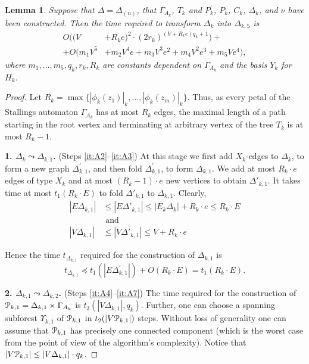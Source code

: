 \documentclass[a4paper,12pt]{article}
\newcommand{\G}{\Gamma }
\newcommand{\D}{\Delta }
\newcommand{\U}{\Upsilon }
\newcommand{\cP}{{\cal{P}}}
\newtheorem{lemma}[theorem]{Lemma}
\numberwithin{equation}{section}
\numberwithin{figure}{section}
\begin{document}
\begin{lemma}\label{lem:resolution} Suppose that $\D = \D_{(n)}$,
that $\G_{A_k}$, $T_k$ and $P_k^\prime$, $P_k$,  $C_k$, $\D_k$, and $\nu$  have been
constructed. Then the time required to transform $\D_k$ into $\D_{k,5}$ is
\[\begin{split}
O((V &+R_k e)^2\cdot (2r_k)^{(V + R_k e) q_k +1})+\\
+O(m_1 V^5 &+ m_2V^4 e +m_3 V^3 e^2 +m_4 V^2 e^3 + m_5 V e^4),
\end{split}
\]
where $m_1, \ldots, m_5, q_k, r_k,  R_k $ are constants dependent on
$\G_{A_k}$ and the basis $Y_k$ for $H_k$.

\end{lemma}

\begin{proof} Let $R_k  = \max \{ |\phi_k(z_1)|_k, \ldots, |\phi_k(z_m)|_k\}$. Thus, as
every petal of the Stallings automaton $\G_{A_k}$ has at most $R_k$
edges, the maximal length of a path starting in the root vertex
and terminating at arbitrary vertex of the tree $T_k$ is at most
$R_k-1$.

{\bf 1. $\D_k \leadsto \D_{k,1}$.}  (Steps \ref{it:A2}--\ref{it:A3}) At this stage we first add
$X_k$-edges to $\D_k$, to form a new graph $\D^\prime_{k,1}$, and then
fold $\D^\prime_{k,1}$, to form $\D_{k,1}$.  We add at most $R_k \cdot e$
edges of type $X_k$ and at most $(R_k-1)\cdot e$ new vertices to
obtain $\D'_{k,1}$. It takes time at most $t_1(R_k \cdot E )$ to fold
$\D'_{k,1}$ to  $\D_{k,1}$. Clearly,
\begin{equation}\label{evth1}
\begin{split}
|E\D_{k,1} | &\le |E\D'_{k,1} | \le |E_k\D_k | + R_k \cdot e \le
R_k \cdot E\\
&{\textrm{ and }}\\
|V \D_{k,1}| &\le |V \D'_{k,1} | \le V + R_k\cdot e
\end{split}
\end{equation}


Hence the time $t_{\D_{k,1}}$ required for the construction of $\D_{k,1}$
is
\begin{equation}\label{theta1}
t_{\D_{k,1}} \preceq t_1(|E \D_{k,1}^\prime |) + O(R_k \cdot E) =t_1(R_k
\cdot E) .
\end{equation}


{\bf 2. $\D_{k,1} \leadsto \D_{k,2}$.}  (Steps \ref{it:A4}--\ref{it:A7}) The time required for the
construction of $\cP_{k,1}=\D_{k,1}\times \G_{A_k}$ is $t_3(|V \D_{k,1}|, q_k)$.
Further, one can choose a spanning subforest $\U_{k,1}$ of $\cP_{k,1}$ in
$t_2(|V\cP_{k,1}|)$ steps. Without loss of generality one can assume
that $\cP_{k,1}$ has precisely one connected component (which is the
worst case from the point of view of the algorithm's complexity).
Notice that $|V\cP_{k,1}| \le |V\D_{k,1}|\cdot q_k$.



\end{proof}
\end{document}
